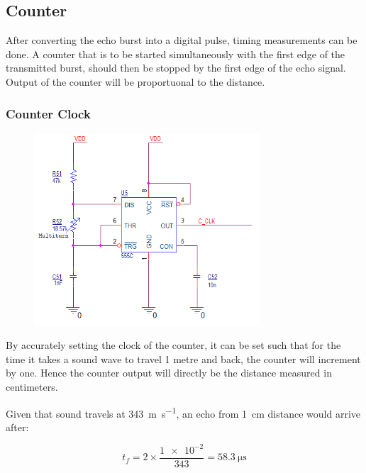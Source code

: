 \documentclass[12pt, a4paper]{article}
\begin{document}
        \subsection{Counter}

            After converting the echo burst into a digital pulse, timing measurements can be done. A counter that is to be started simultaneously with the first edge of the transmitted burst, should then be stopped by the first edge of the echo signal. Output of the counter will be proportuonal to the distance. 
            
            \subsubsection{Counter Clock}

                \begin{figure}[H]\centering
                    \includegraphics[width=0.75\textwidth]{schematics/counter_clock.png}
                    \caption[]{}
                \end{figure}

                By accurately setting the clock of the counter, it can be set such that for the time it takes a sound wave to travel 1 metre and back, the counter will increment by one. Hence the counter output will directly be the distance measured in centimeters. 

                Given that sound travels at \SI{343}{\metre\per\second}, an echo from \SI{1}{\centi\metre} distance would arrive after:
                
                \begin{equation}
                    t_f = 2 \times \frac{\num{1e-2}}{343} = \SI{58.3}{\micro\second}
                \end{equation}
\end{document}
